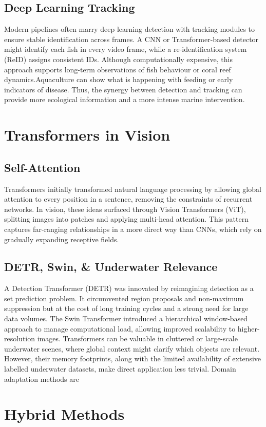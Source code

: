 \subsection{Deep Learning Tracking}
Modern pipelines often marry deep learning detection with tracking modules to ensure stable identification across frames. A CNN or Transformer-based detector might identify each fish in every video frame, while a re-identification system (ReID) assigns consistent IDs. Although computationally expensive, this approach supports long-term observations of fish behaviour or coral reef dynamics.Aquaculture can show what is happening with feeding or early indicators of disease. Thus, the synergy between detection and tracking can provide more ecological information and a more intense marine intervention.
\section{Transformers in Vision}
\subsection{Self-Attention}
Transformers initially transformed natural language processing by allowing global attention to every position in a sentence, removing the constraints of recurrent networks. In vision, these ideas surfaced through Vision Transformers (ViT), splitting images into patches and applying multi-head attention. This pattern captures far-ranging relationships in a more direct way than CNNs, which rely on gradually expanding receptive fields.
\subsection{DETR, Swin, \& Underwater Relevance}
A Detection Transformer (DETR) was innovated by reimagining detection as a set prediction problem. It circumvented region proposals and non-maximum suppression but at the cost of long training cycles and a strong need for large data volumes. The Swin Transformer introduced a hierarchical window-based approach to manage computational load, allowing improved scalability to higher-resolution images. Transformers can be valuable in cluttered or large-scale underwater scenes, where global context might clarify which objects are relevant. However, their memory footprints, along with the limited availability of extensive labelled underwater datasets, make direct application less trivial. Domain adaptation methods are
\section{Hybrid Methods}
